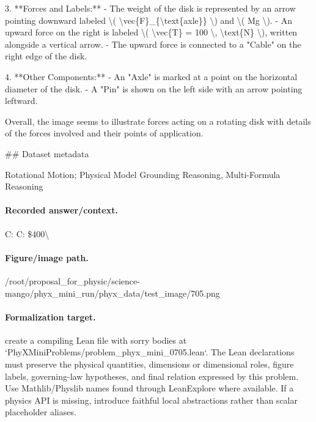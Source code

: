 3. **Forces and Labels:**
   - The weight of the disk is represented by an arrow pointing downward labeled \textbackslash{}( \textbackslash{}vec\{F\}\_\{\textbackslash{}text\{axle\}\} \textbackslash{}) and \textbackslash{}( Mg \textbackslash{}).
   - An upward force on the right is labeled \textbackslash{}( \textbackslash{}vec\{T\} = 100 \textbackslash{}, \textbackslash{}text\{N\} \textbackslash{}), written alongside a vertical arrow.
   - The upward force is connected to a "Cable" on the right edge of the disk.

4. **Other Components:**
   - An "Axle" is marked at a point on the horizontal diameter of the disk.
   - A "Pin" is shown on the left side with an arrow pointing leftward.

Overall, the image seems to illustrate forces acting on a rotating disk with details of the forces involved and their points of application.

\#\# Dataset metadata

Rotational Motion; Physical Model Grounding Reasoning, Multi-Formula Reasoning

\paragraph{Recorded answer/context.}
C: C: \$400\textbackslash{}

\paragraph{Figure/image path.}
/root/proposal\_for\_physic/science-mango/phyx\_mini\_run/phyx\_data/test\_image/705.png

\paragraph{Formalization target.}
create a compiling Lean file with sorry bodies at `PhyXMiniProblems/problem\_phyx\_mini\_0705.lean`. The Lean declarations must preserve the physical quantities, dimensions or dimensional roles, figure labels, governing-law hypotheses, and final relation expressed by this problem.
Use Mathlib/Physlib names found through LeanExplore where available. If a physics API is missing, introduce faithful local abstractions rather than scalar placeholder aliases.

